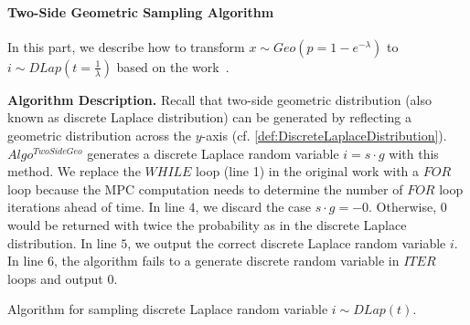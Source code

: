 \paragraph{Two-Side Geometric Sampling Algorithm}
\label{para:TwoSideGeometricSamplingAlgorithm}
In this part, we describe how to transform $x \sim Geo\left(p=1-e^{-\lambda}\right) $ to $i\sim DLap\left(t=\frac{1}{\lambda}\right) $ based on the work~\cite{googleDP2019}.

\textbf{Algorithm Description. }
Recall that two-side geometric distribution (also known as discrete Laplace distribution) can be generated by reflecting a geometric distribution across the $y$-axis (cf. \autoref{def:DiscreteLaplaceDistribution}).
$Algo^{TwoSideGeo}$ generates a discrete Laplace random variable $i=s\cdot g$ with this method. We replace the $WHILE$ loop (line 1) in the original work with a $FOR$ loop because the MPC computation needs to determine the number of $FOR$ loop iterations ahead of time.
In line $4$, we discard the case $s\cdot g =-0$. Otherwise, $0$ would be returned with twice the probability as in the discrete Laplace distribution.
In line $5$, we output the correct discrete Laplace random variable $i$.
In line $6$, the algorithm fails to a generate discrete random variable in $ITER$ loops and output $0$.

\begin{algorithm}[tbh!]
    \centering
    \caption{Algorithm for sampling discrete Laplace random variable $i\sim DLap\left(t\right) $.}
    \label{algo:TwoSideGeometric}
\end{algorithm}
\FloatBarrier

